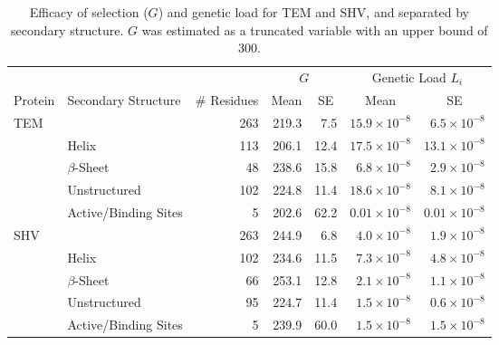 \documentclass[12pt]{article}
\begin{document}
\begin{table}[h]
  \centering
  \caption{Efficacy of selection ($G$) and genetic load for TEM and SHV, and separated by secondary structure. $G$ was estimated as a truncated variable with an upper bound of 300.}
  \begin{tabular}{llrrrrr}
    \hline
    & & & \multicolumn{2}{c}{$G$} & \multicolumn{2}{c}{Genetic Load $L_i$} \\ 
    Protein & Secondary Structure & \# Residues	& \multicolumn{1}{c}{Mean} & \multicolumn{1}{c}{SE} & \multicolumn{1}{c}{Mean} & \multicolumn{1}{c}{SE} \\ \hline 
    TEM	&		& 263 & 219.3 & 7.5  & $15.9\times10^{-8}$ & $6.5\times10^{-8}$ \\
    &Helix 		& 113 & 206.1 & 12.4 & $17.5\times10^{-8}$ & $13.1\times10^{-8}$ \\
    &$\beta$-Sheet 	&  48 & 238.6 & 15.8 & $ 6.8\times10^{-8}$ & $2.9\times10^{-8}$ \\
    &Unstructured 	& 102 & 224.8 & 11.4 & $18.6\times10^{-8}$ & $8.1\times10^{-8}$ \\
    &Active/Binding Sites 	&   5 & 202.6 & 62.2 & $0.01\times10^{-8}$& $0.01\times10^{-8}$ \\ \hline
    
    SHV&		& 263 & 244.9 & 6.8  & $4.0\times10^{-8}$ & $1.9\times10^{-8}$ \\
    &Helix		& 102 & 234.6 & 11.5 & $7.3\times10^{-8}$ & $4.8\times10^{-8}$ \\
    &$\beta$-Sheet 	&  66 & 253.1 & 12.8 & $2.1\times10^{-8}$ & $1.1\times10^{-8}$ \\
    &Unstructured	&  95 & 224.7 & 11.4 & $1.5\times10^{-8}$ & $0.6\times10^{-8}$  \\
    &Active/Binding Sites	&   5 & 239.9 & 60.0 & $1.5\times10^{-8}$ & $1.5\times10^{-8}$ \\ \hline
  \end{tabular}
  \label{tab:selection}
\end{table}
\end{document}
